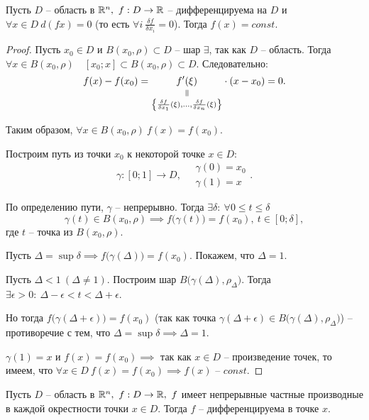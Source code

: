 \begin{corollary}
    Пусть $ D $ -- область в $ \mathbb{R}^n, \ f:D \rightarrow \mathbb{R} $ -- дифференцируема на $ D $ и $ \forall x \in D \ d(fx) = 0 $ (то есть $ \forall i \ \frac{\delta f}{\delta x_i} = 0 $). Тогда $ f(x) = const $.
\end{corollary}

\begin{proof}
    Пусть $ x_0 \in D $ и $ B(x_0,\rho)\subset D $ -- шар $ \exists $, так как $ D $ -- область. Тогда $ \forall x \in B(x_0,\rho) \quad [x_0;x]\subset B(x_0,\rho)\subset D $. Следовательно:
    \[
       f(x) - f(x_0) = \equalto{f'(\xi)}{\left\{\frac{\delta f}{\delta x_1}(\xi),\ldots,\frac{\delta f}{\delta x_n}(\xi)\right\}}\cdot (x-x_0) = 0.
    \]

    Таким образом, $ \forall x \in B(x_0,\rho) \ f(x) = f(x_0) $.

    Построим путь из точки $ x_0 $ к некоторой точке $ x \in D $:
    \[
       \gamma:[0;1]\rightarrow D, \quad \begin{array}{l}
          \gamma(0) = x_0 \\
          \gamma(1) = x
       \end{array}.
    \]

    По определению пути, $ \gamma $ -- непрерывно. Тогда $ \exists\delta: \ \forall 0 \leqslant t \leqslant\delta$
    \[
       \gamma(t) \in B(x_0,\rho) \implies f\big(\gamma(t)\big) = f(x_0), \ t \in [0;\delta],
    \] где $ t $ -- точка из $ B(x_0,\rho) $.

    Пусть $ \Delta = \sup\delta \implies f\big(\gamma(\Delta)\big) = f(x_0) $. Покажем, что $\Delta = 1$.

    Пусть $ \Delta < 1 \ (\Delta \ne 1) $. Построим шар $ B\big(\gamma(\Delta),\rho_\Delta\big) $. Тогда $ \exists \epsilon > 0: \ \Delta - \epsilon < t < \Delta + \epsilon $.

    Но тогда $ f\big(\gamma(\Delta + \epsilon)\big) = f(x_0) $ (так как точка $ \gamma(\Delta + \epsilon) \in B\big(\gamma(\Delta),\rho_\Delta\big) $) -- противоречие с тем, что $ \Delta = \sup\delta \implies \Delta = 1 $.

    $ \gamma(1) = x $ и $ f(x) = f(x_0) \implies $ так как $ x \in D $ -- произведение точек, то имеем, что $ \forall x \in D \ f(x) = f(x_0) \implies f(x)\text{ -- }const $.
\end{proof}

\begin{theorem}
    Пусть $ D $ -- область в $ \R^n, \ f:D \rightarrow\R, \ f $ имеет непрерывные частные производные в каждой окрестности точки $ x\in D $. Тогда $ f $ -- дифференцируема в точке $ x $.
\end{theorem}

